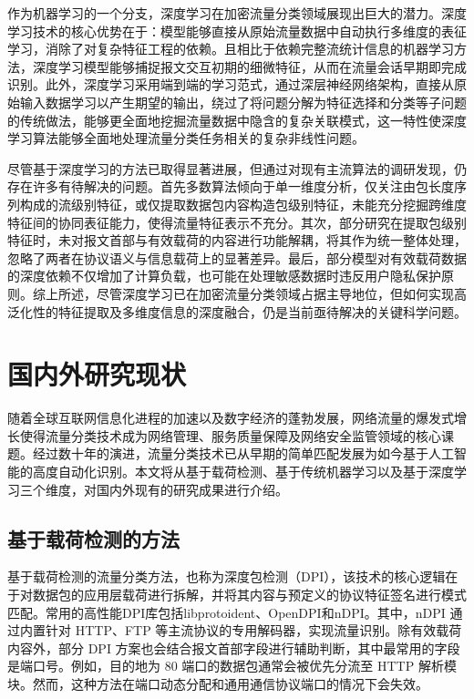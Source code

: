 作为机器学习的一个分支，深度学习在加密流量分类领域展现出巨大的潜力。深度学习技术的核心优势在于：模型能够直接从原始流量数据中自动执行多维度的表征学习，消除了对复杂特征工程的依赖。且相比于依赖完整流统计信息的机器学习方法，深度学习模型能够捕捉报文交互初期的细微特征，从而在流量会话早期即完成识别。此外，深度学习采用端到端的学习范式，通过深层神经网络架构，直接从原始输入数据学习以产生期望的输出，绕过了将问题分解为特征选择和分类等子问题的传统做法，能够更全面地挖掘流量数据中隐含的复杂关联模式，这一特性使深度学习算法能够全面地处理流量分类任务相关的复杂非线性问题。

尽管基于深度学习的方法已取得显著进展，但通过对现有主流算法的调研发现，仍存在许多有待解决的问题。首先多数算法倾向于单一维度分析，仅关注由包长度序列构成的流级别特征，或仅提取数据包内容构造包级别特征，未能充分挖掘跨维度特征间的协同表征能力，使得流量特征表示不充分。其次，部分研究在提取包级别特征时，未对报文首部与有效载荷的内容进行功能解耦，将其作为统一整体处理，忽略了两者在协议语义与信息载荷上的显著差异。最后，部分模型对有效载荷数据的深度依赖不仅增加了计算负载，也可能在处理敏感数据时违反用户隐私保护原则。综上所述，尽管深度学习已在加密流量分类领域占据主导地位，但如何实现高泛化性的特征提取及多维度信息的深度融合，仍是当前亟待解决的关键科学问题。

\section{国内外研究现状}
随着全球互联网信息化进程的加速以及数字经济的蓬勃发展，网络流量的爆发式增长使得流量分类技术成为网络管理、服务质量保障及网络安全监管领域的核心课题。经过数十年的演进，流量分类技术已从早期的简单匹配发展为如今基于人工智能的高度自动化识别。本文将从基于载荷检测、基于传统机器学习以及基于深度学习三个维度，对国内外现有的研究成果进行介绍。

\subsection{基于载荷检测的方法}

基于载荷检测的流量分类方法，也称为深度包检测（DPI），该技术的核心逻辑在于对数据包的应用层载荷进行拆解，并将其内容与预定义的协议特征签名进行模式匹配\cite{khalife2014multilevel}。常用的高性能DPI库包括libprotoident、OpenDPI和nDPI。其中，nDPI 通过内置针对 HTTP、FTP 等主流协议的专用解码器，实现流量识别\cite{xie2020sam}。除有效载荷内容外，部分 DPI 方案也会结合报文首部字段进行辅助判断，其中最常用的字段是端口号。例如，目的地为 80 端口的数据包通常会被优先分流至 HTTP 解析模块\cite{constantinou2006identifying,erman2007identifying}。然而，这种方法在端口动态分配和通用通信协议端口的情况下会失效。

